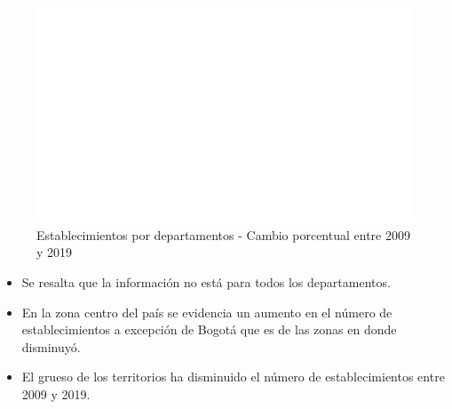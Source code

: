     \begin{figure}[H]
        \caption{Establecimientos por departamentos - Cambio porcentual entre 2009 y 2019 \label{map_result_2} }
        \begin{center}
        \includegraphics[width=\textwidth,keepaspectratio]{img/var_217_map_change.png}
        \end{center}
    \end{figure}
            \begin{itemize}
                    \item Se resalta que la información no está para todos los departamentos.
                    \item En la zona centro del país se evidencia un aumento en el número de establecimientos a excepción de Bogotá que es de las zonas en donde disminuyó.
                    \item El grueso de los territorios ha disminuido el número de establecimientos entre 2009 y 2019.
                    \end{itemize}

